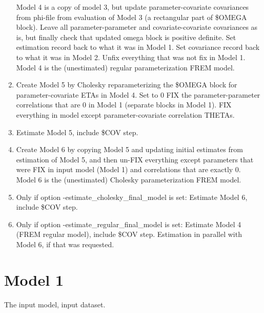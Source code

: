 \begin{enumerate}
Model 4 is a copy of model 3, but update parameter-covariate covariances from phi-file from evaluation of Model 3
(a rectangular part of \$OMEGA block).
Leave all parameter-parameter and covariate-covariate covariances as is, but
finally check that updated omega block is positive definite.
Set estimation record back to what it was in Model 1.
Set covariance record back to what it was in Model 2.
Unfix everything that was not fix in Model 1.
Model 4 is the (unestimated) regular parameterization FREM model.
\item
Create Model 5 by
Cholesky reparameterizing the \$OMEGA block
for parameter-covariate ETAs in Model 4.
Set to 0 FIX the parameter-parameter correlations that are 0 in Model 1 (separate blocks in Model 1).
FIX everything in model except parameter-covariate correlation THETAs.
\item Estimate Model 5, include \$COV step.
\item Create Model 6 
by copying Model 5 and updating initial estimates from
estimation of Model 5, and then un-FIX everything except parameters that
were FIX in input model (Model 1) and correlations that are exactly 0.
Model 6 is the (unestimated) Cholesky parameterization FREM model.
\item Only if option -estimate\_cholesky\_final\_model is set:
Estimate Model 6, include \$COV step.
\item Only if option -estimate\_regular\_final\_model is set:
Estimate Model 4 (FREM regular model), include \$COV step.
Estimation in parallel with Model 6, if that was requested.
\end{enumerate}


\section{Model 1}
The input model, input dataset.

